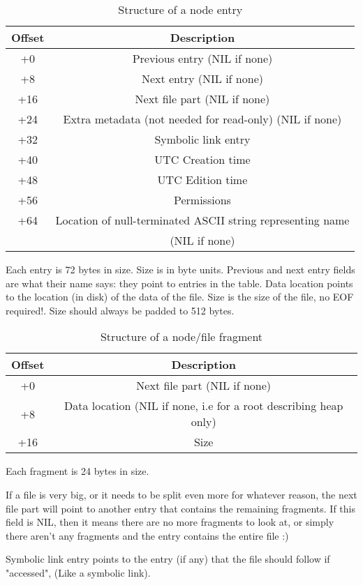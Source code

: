 \documentclass[12pt]{article}
\begin{document}
\begin{table}
\centering
\begin{tabular}{ |c|c| }
\hline
Offset & Description \\
\hline
+0 & Previous entry (NIL if none) \\
+8 & Next entry (NIL if none) \\
+16 & Next file part (NIL if none) \\
+24 & Extra metadata (not needed for read-only) (NIL if none) \\
+32 & Symbolic link entry \\
+40 & UTC Creation time \\
+48 & UTC Edition time \\
+56 & Permissions \\
+64 & Location of null-terminated ASCII string representing name \\
& (NIL if none) \\
\hline
\end{tabular}
\caption{Structure of a node entry}
\end{table}

Each entry is 72 bytes in size. Size is in byte units. Previous and next entry fields are what their name says: they point to entries in the table.
Data location points to the location (in disk) of the data of the file. Size is the size of the file, no EOF required!. Size should always be padded to 512 bytes.

\begin{table}
\centering
\begin{tabular}{ |c|c| }
\hline
Offset & Description \\
\hline
+0 & Next file part (NIL if none) \\
+8 & Data location (NIL if none, i.e for a root describing heap only) \\
+16 & Size \\
\hline
\end{tabular}
\caption{Structure of a node/file fragment}
\end{table}

Each fragment is 24 bytes in size.

If a file is very big, or it needs to be split even more for whatever reason, the next file part will point to another entry that contains the remaining fragments. If this field is NIL, then it means there are no more fragments to look at, or simply there aren't any fragments and the entry contains the entire file :)

Symbolic link entry points to the entry (if any) that the file should follow if "accessed", (Like a symbolic link).
\end{document}
